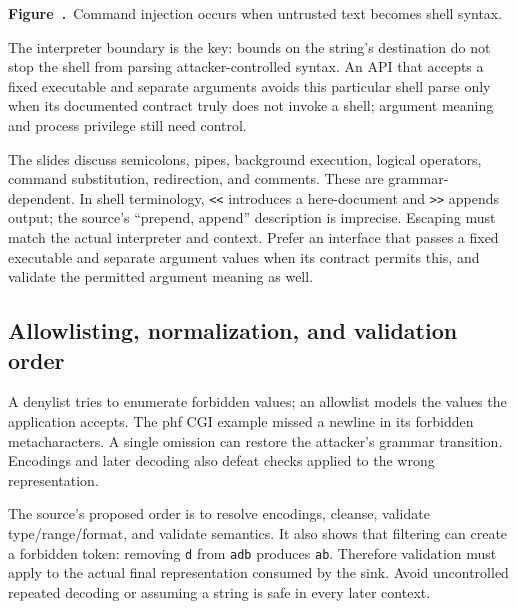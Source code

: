 \documentclass[11pt,a4paper]{article}
\numberwithin{figure}{section}
\newcommand{\diagramcaption}[1]{\par\smallskip\refstepcounter{figure}\begin{center}\small\textbf{Figure~\thefigure.}~#1\end{center}}
\begin{document}
\begin{center}\end{center}
\diagramcaption{Command injection occurs when untrusted text becomes shell syntax.}
The interpreter boundary is the key: bounds on the string's destination do not stop the shell from parsing attacker-controlled syntax. An API that accepts a fixed executable and separate arguments avoids this particular shell parse only when its documented contract truly does not invoke a shell; argument meaning and process privilege still need control.

The slides discuss semicolons, pipes, background execution, logical operators, command substitution, redirection, and comments. These are grammar-dependent. In shell terminology, \texttt{<<} introduces a here-document and \texttt{>>} appends output; the source's ``prepend, append'' description is imprecise. Escaping must match the actual interpreter and context. Prefer an interface that passes a fixed executable and separate argument values when its contract permits this, and validate the permitted argument meaning as well.

\subsection{Allowlisting, normalization, and validation order}
A denylist tries to enumerate forbidden values; an allowlist models the values the application accepts. The phf CGI example missed a newline in its forbidden metacharacters. A single omission can restore the attacker's grammar transition. Encodings and later decoding also defeat checks applied to the wrong representation.

The source's proposed order is to resolve encodings, cleanse, validate type/range/format, and validate semantics. It also shows that filtering can create a forbidden token: removing \texttt{d} from \texttt{adb} produces \texttt{ab}. Therefore validation must apply to the actual final representation consumed by the sink. Avoid uncontrolled repeated decoding or assuming a string is safe in every later context.
\end{document}

